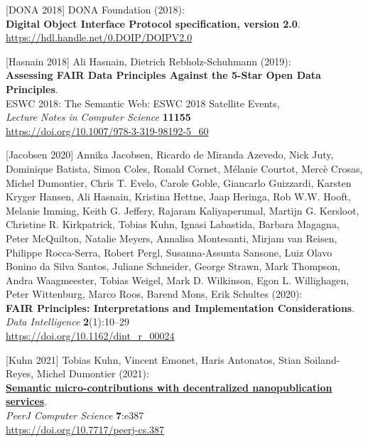 {[}DONA 2018{]} DONA Foundation (2018):\\
\textbf{Digital Object Interface Protocol specification, version 2.0}.\\
\url{https://hdl.handle.net/0.DOIP/DOIPV2.0}

{[}Hasnain 2018{]} Ali Hasnain, Dietrich Rebholz-Schuhmann (2019):\\
\textbf{Assessing FAIR Data Principles Against the 5-Star Open Data
Principles}.\\
ESWC 2018: The Semantic Web: ESWC 2018 Satellite Events,\\
\emph{Lecture Notes in Computer Science} \textbf{11155}\\
\url{https://doi.org/10.1007/978-3-319-98192-5_60}

{[}Jacobsen 2020{]} Annika Jacobsen, Ricardo de Miranda Azevedo, Nick
Juty, Dominique Batista, Simon Coles, Ronald Cornet, Mélanie Courtot,
Mercè Crosas, Michel Dumontier, Chris T. Evelo, Carole Goble, Giancarlo
Guizzardi, Karsten Kryger Hansen, Ali Hasnain, Kristina Hettne, Jaap
Heringa, Rob W.W. Hooft, Melanie Imming, Keith G. Jeffery, Rajaram
Kaliyaperumal, Martijn G. Kersloot, Christine R. Kirkpatrick, Tobias
Kuhn, Ignasi Labastida, Barbara Magagna, Peter McQuilton, Natalie
Meyers, Annalisa Montesanti, Mirjam van Reisen, Philippe Rocca-Serra,
Robert Pergl, Susanna-Assunta Sansone, Luiz Olavo Bonino da Silva
Santos, Juliane Schneider, George Strawn, Mark Thompson, Andra
Waagmeester, Tobias Weigel, Mark D. Wilkinson, Egon L. Willighagen,
Peter Wittenburg, Marco Roos, Barend Mons, Erik Schultes (2020):\\
\textbf{FAIR Principles: Interpretations and Implementation
Considerations}.\\
\emph{Data Intelligence} \textbf{2}(1):10--29\\
\url{https://doi.org/10.1162/dint_r_00024}

{[}Kuhn 2021{]} Tobias Kuhn, Vincent Emonet, Haris Antonatos, Stian
Soiland-Reyes, Michel Dumontier (2021):\\
\href{../../../2021/phd/nanopub/}{\textbf{Semantic micro-contributions
with decentralized nanopublication services}}.\\
\emph{PeerJ Computer Science} \textbf{7}:e387\\
\url{https://doi.org/10.7717/peerj-cs.387}

